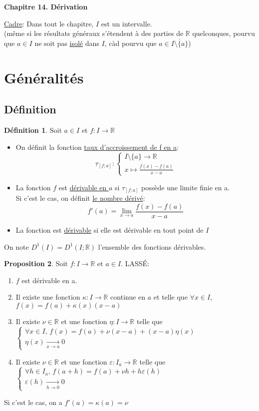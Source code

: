 \documentclass[10pt,a4paper]{article}
\theoremstyle{definition}
\newtheorem{proposition}{Proposition}[section]
\newtheorem{definition}[proposition]{Définition}
\begin{document}
\renewcommand{\labelitemi}{$*$}
\renewcommand{\labelenumi}{(\roman{enumi})}
\begin{center}
{\Large \textbf{Chapitre 14. Dérivation}}
\end{center}
\uline{Cadre}: Dans tout le chapitre, $I$ est un intervalle. \\
(même si les résultats généraux s'étendent à des parties de $\mathbb{R}$ quelconques, pourvu que $a \in I$ ne soit pas \uline{isolé} dans $I$, càd pourvu que $a \in \overline{I \setminus \{ a \}}$)

\section{Généralités}
\subsection{Définition}
\begin{definition}
Soit $a \in I$ et $f: I \to \mathbb{R}$
\begin{itemize}
\item On définit la fonction \uline{taux d'accroissement de f en a}:
\[\tau_{[f; a]} : \begin{cases}
I \setminus \{ a \} \to \mathbb{R} \\
x \mapsto \frac{f(x) - f(a)}{x - a}
\end{cases}\]
\item La fonction $f$ est \uline{dérivable en $a$} si $\tau_{[f; a]}$ possède une limite finie en a. \\
Si c'est le cas, on définit \uline{le nombre dérivé}:
\[f'(a) = \lim\limits_{x \to a} \frac{f(x) - f(a)}{x - a}\]
\item La fonction est \uline{dérivable} si elle est dérivable en tout point de $I$
\end{itemize}
On note $D^1(I) = D^1(I; \mathbb{R})$ l'ensemble des fonctions dérivables.
\end{definition}
\begin{proposition}
Soit $f:I \to \mathbb{R}$ et $a \in I$. LASSÉ:
\begin{enumerate}
\item $f$ est dérivable en a.
\item Il existe une fonction $\kappa: I \to \mathbb{R}$ continue en $a$ et telle que $\forall x \in I$, $f(x) = f(a) + \kappa(x)(x - a)$
\item Il existe $\nu \in \mathbb{R}$ et une fonction $\eta: I \to \mathbb{R}$ telle que $\begin{cases}
\forall x \in I ,\, f(x) = f(a) + \nu(x - a) + (x - a) \eta(x) \\
\eta(x) \xrightarrow[x \to a]{} 0 
\end{cases}$
\item Il existe $\nu \in \mathbb{R}$ et une fonction $\varepsilon: I_a \to \mathbb{R}$ telle que $\begin{cases}
\forall h \in I_a ,\, f(a + h) = f(a) + \nu h + h \varepsilon(h) \\
\varepsilon(h) \xrightarrow[h \to 0]{} 0
\end{cases}$
\end{enumerate}
Si c'est le cas, on a $f'(a) = \kappa(a) = \nu$
\end{proposition}
\end{document}
